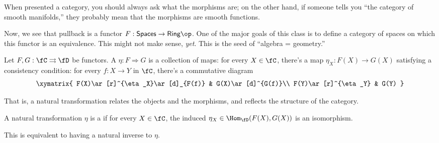 When presented a category, you should always ask what the morphisms are; on the other hand, if someone tells you
``the category of smooth manifolds,'' they probably mean that the morphisms are smooth functions.

Now, we see that pullback is a functor \(F:\mathsf{Spaces}\to\mathsf{Ring}\op\). One of the major goals of this
class is to define a category of spaces on which this functor is an equivalence. This might not make sense,
\emph{yet}. This is the seed of ``algebra = geometry.''
\begin{defn} %
Let \(F,G:\fC\rightrightarrows\fD\) be functors. A  \(\eta:F\Rightarrow G\) is a
collection of maps: for every \(X\in\fC\), there's a map \(\eta_X:F(X)\to G(X)\) satisfying a consistency
condition: for every \(f:X\to Y\) in \(\fC\), there's a commutative diagram
\[\xymatrix{
	F(X)\ar[r]^{\eta_X}\ar[d]_{F(f)} & G(X)\ar[d]^{G(f)}\\
	F(Y)\ar[r]^{\eta_Y} & G(Y)
}\]
\end{defn}
That is, a natural transformation relates the objects and the morphisms, and reflects the structure of the
category.
\begin{defn}
A natural transformation \(\eta\) is a  if for every \(X\in\fC\), the induced
\(\eta_X\in\Hom_{\fD}(F(X),G(X))\) is an isomorphism.
\end{defn}
This is equivalent to having a natural inverse to \(\eta\).

